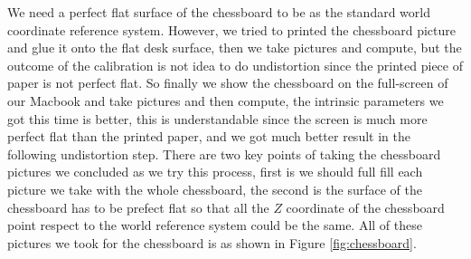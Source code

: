 \documentclass[10pt,twocolumn,letterpaper]{article}
\begin{document}
We need a perfect flat surface of the chessboard to be as the standard world coordinate reference system. However, we tried to printed the chessboard picture and glue it onto the flat desk surface, then we take pictures and compute, but the outcome of the calibration is not idea to do undistortion since the printed piece of paper is not perfect flat. So finally we show the chessboard on the full-screen of our Macbook and take pictures and then compute, the intrinsic parameters we got this time is better, this is understandable since the screen is much more perfect flat than the printed paper, and we got much better result in the following undistortion step. There are two key points of taking the chessboard pictures we concluded as we try this process, first is we should full fill each picture we take with the whole chessboard, the second is the surface of the chessboard has to be prefect flat so that all the $Z$ coordinate of the chessboard point respect to the world reference system could be the same. All of these pictures we took for the chessboard is as shown in Figure \ref{fig:chessboard}.
\end{document}
